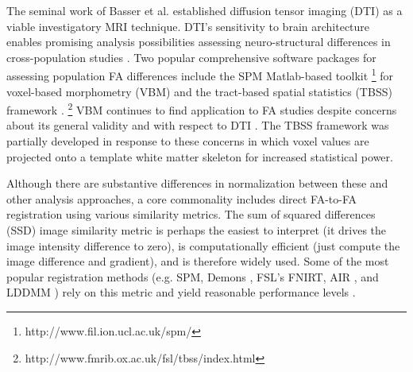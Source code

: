 \documentclass[final,5p,times,twocolumn]{elsarticle}
\begin{document}
The seminal work of Basser et al. \citep{Basser1994a,Basser1994} established diffusion tensor imaging (DTI) as a viable investigatory MRI technique.  DTI's sensitivity to brain architecture \citep{Basser1996,Assaf2008} enables promising analysis possibilities assessing neuro-structural differences in cross-population studies \citep{Kubicki2005,Arnone2008,Kantarci2010,Rametti2010}.
Two popular comprehensive software packages for assessing population FA differences include the SPM Matlab-based toolkit%
\footnote{
http://www.fil.ion.ucl.ac.uk/spm/
}
for voxel-based morphometry (VBM)
and the tract-based spatial statistics (TBSS) framework \citep{Smith2006}.%
\footnote{
http://www.fmrib.ox.ac.uk/fsl/tbss/index.html
} 
VBM \citep{Ashburner2001} continues to find application to FA studies \citep{Kakeda2010,Takao2010,Preziosa2011} despite concerns about its general validity \citep{Bookstein2001,Davatzikos2004} and with respect to DTI \citep{Jones2005,Chung2008}.  The TBSS framework was partially developed in response to these concerns in which voxel values are projected onto a template white matter skeleton for increased statistical power.  

Although there are substantive differences in normalization
between these and other analysis approaches, a core
commonality includes direct FA-to-FA registration using various similarity metrics.  The sum of squared differences (SSD) image similarity metric is perhaps the easiest to interpret (it drives the image intensity difference to zero), is computationally efficient (just compute the image difference and gradient), and is therefore widely used.  Some of the most popular registration methods (e.g. SPM, 
Demons \cite{Thirion1998}, FSL's FNIRT, AIR \citep{Woods1998}, and LDDMM \citep{Beg2005}) rely on this metric and yield reasonable performance levels \citep{Klein2009}.%
\end{document}
